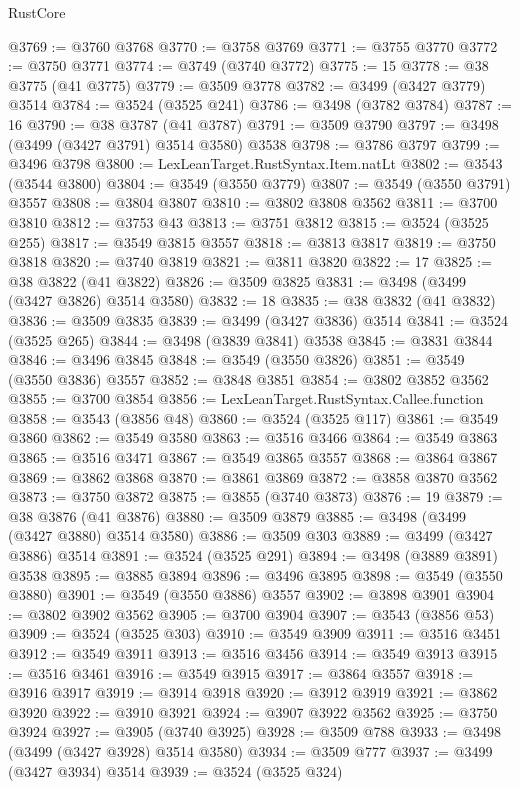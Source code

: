 \begin{lexlean}{RustCore}
\begin{coremodule}
@3769 := @3760 @3768
@3770 := @3758 @3769
@3771 := @3755 @3770
@3772 := @3750 @3771
@3774 := @3749 (@3740 @3772)
@3775 := 15
@3778 := @38 @3775 (@41 @3775)
@3779 := @3509 @3778
@3782 := @3499 (@3427 @3779) @3514
@3784 := @3524 (@3525 @241)
@3786 := @3498 (@3782 @3784)
@3787 := 16
@3790 := @38 @3787 (@41 @3787)
@3791 := @3509 @3790
@3797 := @3498 (@3499 (@3427 @3791) @3514 @3580) @3538
@3798 := @3786 @3797
@3799 := @3496 @3798
@3800 := LexLeanTarget.RustSyntax.Item.natLt
@3802 := @3543 (@3544 @3800)
@3804 := @3549 (@3550 @3779)
@3807 := @3549 (@3550 @3791) @3557
@3808 := @3804 @3807
@3810 := @3802 @3808 @3562
@3811 := @3700 @3810
@3812 := @3753 @43
@3813 := @3751 @3812
@3815 := @3524 (@3525 @255)
@3817 := @3549 @3815 @3557
@3818 := @3813 @3817
@3819 := @3750 @3818
@3820 := @3740 @3819
@3821 := @3811 @3820
@3822 := 17
@3825 := @38 @3822 (@41 @3822)
@3826 := @3509 @3825
@3831 := @3498 (@3499 (@3427 @3826) @3514 @3580)
@3832 := 18
@3835 := @38 @3832 (@41 @3832)
@3836 := @3509 @3835
@3839 := @3499 (@3427 @3836) @3514
@3841 := @3524 (@3525 @265)
@3844 := @3498 (@3839 @3841) @3538
@3845 := @3831 @3844
@3846 := @3496 @3845
@3848 := @3549 (@3550 @3826)
@3851 := @3549 (@3550 @3836) @3557
@3852 := @3848 @3851
@3854 := @3802 @3852 @3562
@3855 := @3700 @3854
@3856 := LexLeanTarget.RustSyntax.Callee.function
@3858 := @3543 (@3856 @48)
@3860 := @3524 (@3525 @117)
@3861 := @3549 @3860
@3862 := @3549 @3580
@3863 := @3516 @3466
@3864 := @3549 @3863
@3865 := @3516 @3471
@3867 := @3549 @3865 @3557
@3868 := @3864 @3867
@3869 := @3862 @3868
@3870 := @3861 @3869
@3872 := @3858 @3870 @3562
@3873 := @3750 @3872
@3875 := @3855 (@3740 @3873)
@3876 := 19
@3879 := @38 @3876 (@41 @3876)
@3880 := @3509 @3879
@3885 := @3498 (@3499 (@3427 @3880) @3514 @3580)
@3886 := @3509 @303
@3889 := @3499 (@3427 @3886) @3514
@3891 := @3524 (@3525 @291)
@3894 := @3498 (@3889 @3891) @3538
@3895 := @3885 @3894
@3896 := @3496 @3895
@3898 := @3549 (@3550 @3880)
@3901 := @3549 (@3550 @3886) @3557
@3902 := @3898 @3901
@3904 := @3802 @3902 @3562
@3905 := @3700 @3904
@3907 := @3543 (@3856 @53)
@3909 := @3524 (@3525 @303)
@3910 := @3549 @3909
@3911 := @3516 @3451
@3912 := @3549 @3911
@3913 := @3516 @3456
@3914 := @3549 @3913
@3915 := @3516 @3461
@3916 := @3549 @3915
@3917 := @3864 @3557
@3918 := @3916 @3917
@3919 := @3914 @3918
@3920 := @3912 @3919
@3921 := @3862 @3920
@3922 := @3910 @3921
@3924 := @3907 @3922 @3562
@3925 := @3750 @3924
@3927 := @3905 (@3740 @3925)
@3928 := @3509 @788
@3933 := @3498 (@3499 (@3427 @3928) @3514 @3580)
@3934 := @3509 @777
@3937 := @3499 (@3427 @3934) @3514
@3939 := @3524 (@3525 @324)

\end{coremodule}
\end{lexlean}
